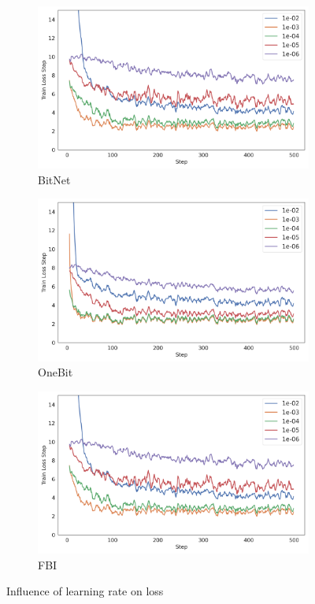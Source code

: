 \documentclass{article}
\begin{document}
\begin{figure}[ht]
  \centering
  \begin{subfigure}[b]{0.3\textwidth}
    \includegraphics[width=\linewidth]{../data/plots/BitNet_lr.png}
    \caption{BitNet}
  \end{subfigure}
  \hfill
  \begin{subfigure}[b]{0.3\textwidth}
    \includegraphics[width=\linewidth]{../data/plots/OneBit_lr.png}
    \caption{OneBit}
  \end{subfigure}
  \hfill
  \begin{subfigure}[b]{0.3\textwidth}
    \includegraphics[width=\linewidth]{../data/plots/BitNet_lr.png}
    \caption{FBI}
  \end{subfigure}
  \vspace{0.5em}
  \caption{Influence of learning rate on loss}
  \label{fig:lr}
\end{figure}
\end{document}
